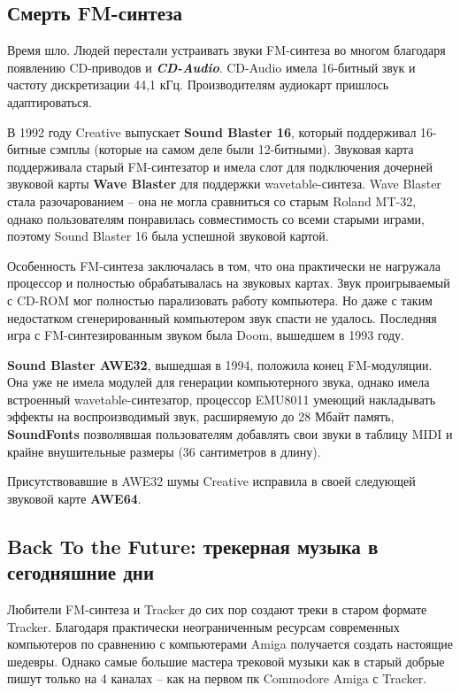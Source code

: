 \documentclass[a4paper,12pt]{extarticle}
\begin{document}
    \subsection{Смерть FM-синтеза}
    Время шло. Людей перестали устраивать звуки FM-синтеза во многом благодаря появлению CD-приводов и \textbf{\textit{CD-Audio}}. CD-Audio имела 16-битный звук и частоту дискретизации 44,1 кГц. Производителям аудиокарт пришлось адаптироваться.

    В 1992 году Creative выпускает \textbf{Sound Blaster 16}, который поддерживал 16-битные сэмплы (которые на самом деле были 12-битными). Звуковая карта поддерживала старый FM-синтезатор и имела слот для подключения дочерней звуковой карты \textbf{Wave Blaster} для поддержки wavetable-синтеза. Wave Blaster стала разочарованием – она не могла сравниться со старым Roland MT-32, однако пользователям понравилась совместимость со всеми старыми играми, поэтому Sound Blaster 16 была успешной звуковой картой.

    Особенность FM-синтеза заключалась в том, что она практически не нагружала процессор и полностью обрабатывалась на звуковых картах. Звук проигрываемый с CD-ROM мог полностью парализовать работу компьютера. Но даже с таким недостатком сгенерированный компьютером звук спасти не удалось. Последняя игра с FM-синтезированным звуком была Doom, вышедшем в 1993 году.

    \textbf{Sound Blaster AWE32}, вышедшая в 1994, положила конец FM-модуляции. Она уже не имела модулей для генерации компьютерного звука, однако имела встроенный wavetable-синтезатор, процессор EMU8011 умеющий накладывать эффекты на воспроизводимый звук, расширяемую до 28 Мбайт память, \textbf{SoundFonts} позволявшая пользователям добавлять свои звуки в таблицу MIDI и крайне внушительные размеры (36 сантиметров в длину).

    Присутствовавшие в AWE32 шумы Creative исправила в своей следующей звуковой карте \textbf{AWE64}.

    \subsection{Back To the Future: трекерная музыка в сегодняшние дни}
    Любители FM-синтеза и Tracker до сих пор создают треки в старом формате Tracker. Благодаря практически неограниченным ресурсам современных компьютеров по сравнению с компьютерами Amiga получается создать настоящие шедевры. Однако самые большие мастера трековой музыки как в старый добрые пишут только на 4 каналах – как на первом пк Commodore Amiga с Tracker.
\end{document}

